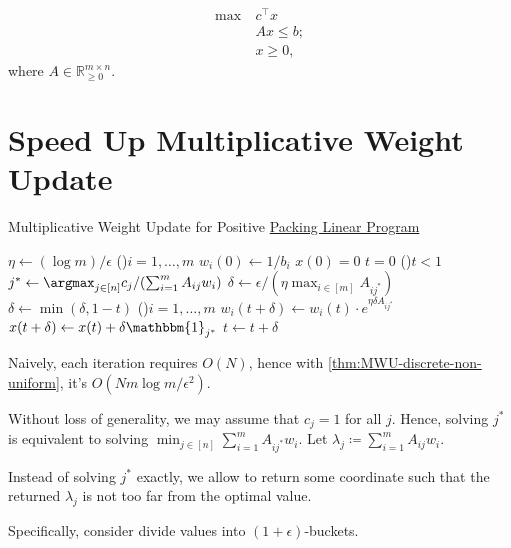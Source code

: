 \[
	\begin{aligned}
		\max~ & c^{\top} x  \\
		      & Ax \leq b ; \\
		      & x \geq 0,
	\end{aligned}
\]
where \(A \in \mathbb{R} _{\geq 0}^{m \times n}\).

\section{Speed Up Multiplicative Weight Update}
\begin{algorithm}[H]\label{algo:MWU-discrete-linear}
	\DontPrintSemicolon{}
	\caption{Multiplicative Weight Update for Positive \hyperref[def:packing-LP]{Packing Linear Program}}
	\BlankLine

	\(\eta \gets (\log m) / \epsilon \)\;
	\For(){\(i = 1, \dots , m\)}{
		\(w_i(0) \gets 1 / b_i\)\;
	}
	\(x(0) = 0\)
	\(t = 0\)\;
	\;
	\While(){\(t < 1\)}{
	\(j^{\ast} \gets \argmax_{j \in [n]} c_j / (\sum_{i=1}^{m} A_{ij} w_i)\)\;
	\(\delta \gets \epsilon / (\eta \max _{i \in [m]} A_{ij^{\ast} })\)
	\(\delta \gets \min (\delta , 1 - t)\)
	\For(){\(i = 1, \dots , m\)}{
		\(w_i(t+\delta ) \gets w_i(t) \cdot e^{\eta \delta A_{ij^{\ast} }}\)\;
	}
	\(x (t+\delta ) \gets x (t) + \delta \mathbbm{1}_{j^{\ast} }\)\;
	\(t \gets t + \delta \)\;
	}
	\;
\end{algorithm}

Naively, each iteration requires \(O(N)\), hence with \autoref{thm:MWU-discrete-non-uniform}, it's \(O(N m \log m / \epsilon ^2)\).

Without loss of generality, we may assume that \(c_j = 1\) for all \(j\). Hence, solving \(j^{\ast} \) is equivalent to solving \(\min _{j \in [n]} \sum_{i=1}^{m} A_{ij^{\ast} } w_i\). Let \(\lambda _j \coloneqq \sum_{i=1}^{m} A_{ij} w_i\).

\begin{intuition}
	Instead of solving \(j^{\ast} \) exactly, we allow to return some coordinate such that the returned \(\lambda _j\) is not too far from the optimal value.
\end{intuition}

Specifically, consider divide values into \((1 + \epsilon )\)-buckets.

